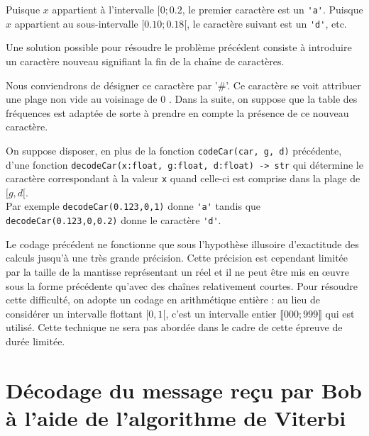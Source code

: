 Puisque $x$ appartient à l'intervalle $[0 ; 0.2$, le premier caractère est un \lstinline{'a'}. Puisque $x$ appartient au sous-intervalle $[0.10; 0.18[$, le caractère suivant est un \lstinline{'d'}, etc.



Une solution possible pour résoudre le problème précédent consiste à introduire un caractère nouveau signifiant la fin de la chaîne de caractères.

Nous conviendrons de désigner ce caractère par '\#'. Ce caractère se voit attribuer une plage non vide au voisinage de 0 . Dans la suite, on suppose que la table des fréquences est adaptée de sorte à prendre en compte la présence de ce nouveau caractère.

On suppose disposer, en plus de la fonction \lstinline{codeCar(car, g, d)} précédente, d'une fonction \lstinline{decodeCar(x:float, g:float, d:float) -> str} qui détermine le caractère correspondant à la valeur \lstinline{x} quand celle-ci est comprise dans la plage de $[g, d[$.\\
Par exemple \lstinline{decodeCar(0.123,0,1)} donne \lstinline{'a'} tandis que \lstinline{decodeCar(0.123,0,0.2)} donne le caractère \lstinline{'d'}.


Le codage précédent ne fonctionne que sous l'hypothèse illusoire d'exactitude des calculs jusqu'à une très grande précision. Cette précision est cependant limitée par la taille de la mantisse représentant un réel et il ne peut être mis en œuvre sous la forme précédente qu'avec des chaînes relativement courtes. Pour résoudre cette difficulté, on adopte un codage en arithmétique entière : au lieu de considérer un intervalle flottant $[0,1[$, c'est un intervalle entier $\llbracket 000 ; 999 \rrbracket$ qui est utilisé. Cette technique ne sera pas abordée dans le cadre de cette épreuve de durée limitée.

\section{Décodage du message reçu par Bob à l'aide de l'algorithme de Viterbi}
